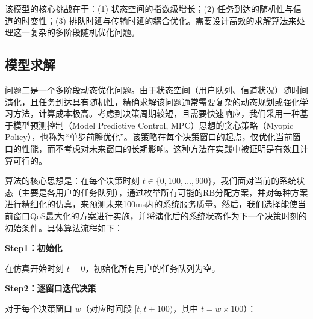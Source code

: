 该模型的核心挑战在于：(1) 状态空间的指数级增长；(2) 任务到达的随机性与信道的时变性；(3) 排队时延与传输时延的耦合优化。需要设计高效的求解算法来处理这一复杂的多阶段随机优化问题。

\subsection{模型求解}

问题二是一个多阶段动态优化问题。由于状态空间（用户队列、信道状况）随时间演化，且任务到达具有随机性，精确求解该问题通常需要复杂的动态规划或强化学习方法，计算成本极高。考虑到决策周期较短，且需要快速响应，我们采用一种基于模型预测控制（Model Predictive Control, MPC）思想的贪心策略（Myopic Policy），也称为“单步前瞻优化”。该策略在每个决策窗口的起点，仅优化当前窗口的性能，而不考虑对未来窗口的长期影响。这种方法在实践中被证明是有效且计算可行的。

算法的核心思想是：在每个决策时刻 $t \in \{0, 100, \dots, 900\}$，我们面对当前的系统状态（主要是各用户的任务队列），通过枚举所有可能的RB分配方案，并对每种方案进行精细化的仿真，来预测未来100ms内的系统服务质量。然后，我们选择能使当前窗口QoS最大化的方案进行实施，并将演化后的系统状态作为下一个决策时刻的初始条件。具体算法流程如下：

\textbf{Step1：初始化}

在仿真开始时刻 $t=0$，初始化所有用户的任务队列为空。

\textbf{Step2：逐窗口迭代决策}

对于每个决策窗口 $w$（对应时间段 $[t, t+100)$，其中 $t = w \times 100$）：

